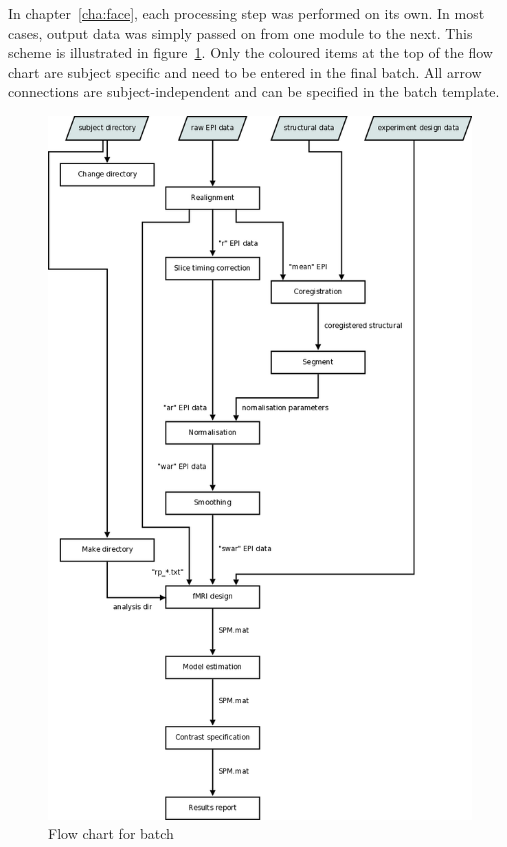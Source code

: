 In chapter~\ref{cha:face}, each processing step was performed on its own. In
most cases, output data was simply passed on from one module to the next. This
scheme is illustrated in figure~\ref{fig:flow}. Only the coloured items at the
top of the flow chart are subject specific and need to be entered in the final
batch. All arrow connections are subject-independent and can be specified in
the batch template.

\begin{figure}
  \centering
  \includegraphics[height=.9\textheight]{batch/flow}
  \caption{Flow chart for batch}
  \label{fig:flow}
\end{figure}

